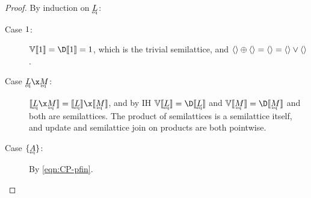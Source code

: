 \documentclass{rntz}\usepackage{fantasy}%
\begin{document}


\lemSemi*
\begin{proof}\label{proof:semi}
  By induction on $\eqt L$:

  \begin{description}
  \item[Case $1$:] \(\vals{\den \tunit} = \chgs{\den \tunit} = \termO\),
    which is the trivial semilattice, and \(\langle{}\rangle \mathbin{\oplus} \langle{}\rangle = \langle{}\rangle
    = \langle{}\rangle \vee \langle{}\rangle\).

  \item[Case $\eqt L \x \eqt M$:] \(\den{\eqt L \x \eqt M} = \den{\eqt L} \x
    \den{\eqt M}\), and by IH $\vals{\den{\eqt L}} = \chgs{\den{\eqt L}}$ and
    \(\vals{\den{\eqt M}} = \chgs{\den{\eqt M}}\) and both are semilattices. The
    product of semilattices is a semilattice itself, and update and semilattice
    join on products are both pointwise.

  \item[Case $\tseteq A$:] By \cref{eqn:CP-pfin}.
  \end{description}
\end{proof}
\end{document}
